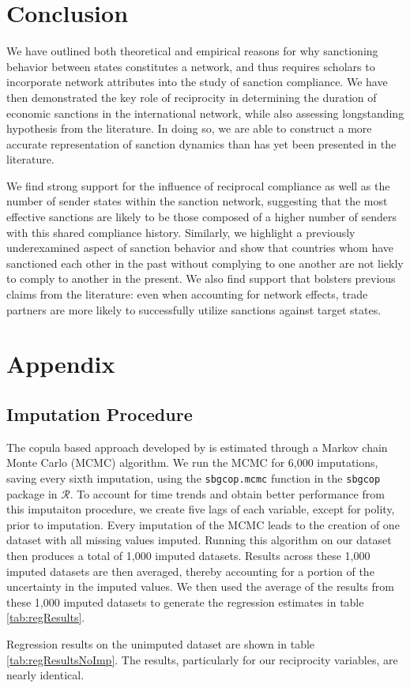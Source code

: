 \section*{Conclusion}
\label{conclusion}

We have outlined both theoretical and empirical reasons for why sanctioning behavior between states constitutes a network, and thus requires scholars to incorporate network attributes into the study of sanction compliance. We have then demonstrated the key role of reciprocity in determining the duration of economic sanctions in the international network, while also assessing longstanding hypothesis from the literature. In doing so, we are able to construct a more accurate representation of sanction dynamics than has yet been presented in the literature. 

We find strong support for the influence of reciprocal compliance as well as the number of sender states within the sanction network, suggesting that the most effective sanctions are likely to be those composed of a higher number of senders with this shared compliance history. Similarly, we highlight a previously underexamined aspect of sanction behavior and show that countries whom have sanctioned each other in the past without complying to one another are not liekly to comply to another in the present. We also find support that bolsters previous claims from the literature: even when accounting for network effects, trade partners are more likely to successfully utilize sanctions against target states.  




\newpage
\section*{Appendix}
\label{appendix}

\subsection*{Imputation Procedure}

The copula based approach developed by \citet{hoff:2007} is estimated through a Markov chain Monte Carlo (MCMC) algorithm. We run the MCMC for 6,000 imputations, saving every sixth imputation, using the \texttt{sbgcop.mcmc} function in the \texttt{sbgcop} package in $\mathcal{R}$. To account for time trends and obtain better performance from this imputaiton procedure, we create five lags of each variable, except for polity, prior to imputation. Every imputation of the MCMC leads to the creation of one dataset with all missing values imputed. Running this algorithm on our dataset then produces a total of 1,000 imputed datasets. Results across these 1,000 imputed datasets are then averaged, thereby accounting for a portion of the uncertainty in the imputed values. We then used the average of the results from these 1,000 imputed datasets to generate the regression estimates in table \ref{tab:regResults}. 

Regression results on the unimputed dataset are shown in table \ref{tab:regResultsNoImp}. The results, particularly for our reciprocity variables, are nearly identical. 


\FloatBarrier

\newpage